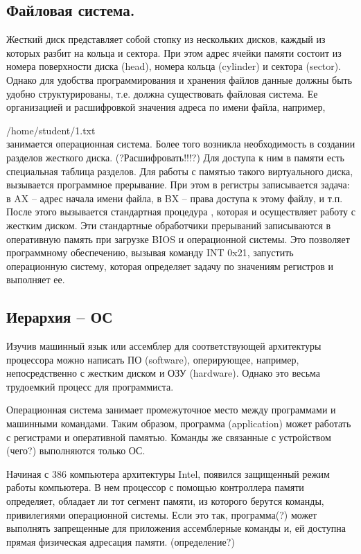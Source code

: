 \documentclass[a4paper, fleqn]{article}
\begin{document}
		\subsection*{Файловая система.}  
			Жесткий диск представляет собой стопку из нескольких дисков, каждый из которых разбит на кольца и сектора. При этом адрес ячейки памяти состоит из номера поверхности диска (head), номера кольца (cylinder) и сектора (sector).  Однако для удобства программирования и хранения файлов данные должны быть удобно структурированы, т.е. должна существовать файловая система. Ее организацией и расшифровкой значения адреса по имени файла, например, \par
			/home/student/1.txt
			\\
			занимается операционная система. Более того возникла необходимость в создании разделов жесткого диска. (?Расшифровать!!!?)  Для доступа к ним в памяти есть специальная таблица разделов. Для работы с памятью такого виртуального диска, вызывается программное прерывание. При этом в регистры записывается задача: в AX – адрес начала имени файла, в BX – права доступа  к этому файлу, и т.п. После этого вызывается стандартная процедура , которая и осуществляет работу с жестким диском. Эти стандартные обработчики прерываний записываются в оперативную память при загрузке BIOS и операционной системы. Это позволяет программному обеспечению, вызывая команду INT 0x21, запустить операционную систему, которая определяет задачу по значениям регистров и выполняет ее.
			
			
			\subsection*{Иерархия – ОС} 
			Изучив машинный язык или ассемблер для соответствующей архитектуры процессора можно написать ПО (software), оперирующее, например, непосредственно с жестким диском и ОЗУ (hardware). Однако это весьма трудоемкий процесс для программиста. 
			
			Операционная система занимает промежуточное место между программами и машинными командами. Таким образом, программа (application) может работать с регистрами и оперативной памятью. Команды же связанные с устройством (чего?) выполняются только ОС.
			
			Начиная с 386 компьютера архитектуры Intel, появился защищенный режим работы компьютера. В нем процессор с помощью контроллера памяти определяет, обладает ли тот сегмент памяти, из которого берутся команды, привилегиями операционной системы. Если это так, программа(?) может выполнять запрещенные для приложения ассемблерные команды и, ей доступна прямая физическая адресация памяти. (определение?)
			
\end{document}
